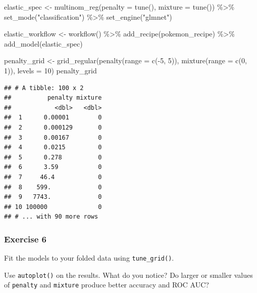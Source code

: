 \documentclass[
]{article}
\newenvironment{Shaded}{\begin{snugshade}}{\end{snugshade}}
\newcommand{\AttributeTok}[1]{\textcolor[rgb]{0.77,0.63,0.00}{#1}}
\newcommand{\DecValTok}[1]{\textcolor[rgb]{0.00,0.00,0.81}{#1}}
\newcommand{\FunctionTok}[1]{\textcolor[rgb]{0.00,0.00,0.00}{#1}}
\newcommand{\NormalTok}[1]{#1}
\newcommand{\OtherTok}[1]{\textcolor[rgb]{0.56,0.35,0.01}{#1}}
\newcommand{\SpecialCharTok}[1]{\textcolor[rgb]{0.00,0.00,0.00}{#1}}
\newcommand{\StringTok}[1]{\textcolor[rgb]{0.31,0.60,0.02}{#1}}
\begin{document}
\begin{Shaded}
\begin{Highlighting}[]
\NormalTok{elastic\_spec }\OtherTok{\textless{}{-}} 
  \FunctionTok{multinom\_reg}\NormalTok{(}\AttributeTok{penalty =} \FunctionTok{tune}\NormalTok{(), }\AttributeTok{mixture =} \FunctionTok{tune}\NormalTok{()) }\SpecialCharTok{\%\textgreater{}\%} 
  \FunctionTok{set\_mode}\NormalTok{(}\StringTok{"classification"}\NormalTok{) }\SpecialCharTok{\%\textgreater{}\%} 
  \FunctionTok{set\_engine}\NormalTok{(}\StringTok{"glmnet"}\NormalTok{)}

\NormalTok{elastic\_workflow }\OtherTok{\textless{}{-}} \FunctionTok{workflow}\NormalTok{() }\SpecialCharTok{\%\textgreater{}\%} 
  \FunctionTok{add\_recipe}\NormalTok{(pokemon\_recipe) }\SpecialCharTok{\%\textgreater{}\%} 
  \FunctionTok{add\_model}\NormalTok{(elastic\_spec)}

\NormalTok{penalty\_grid }\OtherTok{\textless{}{-}} \FunctionTok{grid\_regular}\NormalTok{(}\FunctionTok{penalty}\NormalTok{(}\AttributeTok{range =} \FunctionTok{c}\NormalTok{(}\SpecialCharTok{{-}}\DecValTok{5}\NormalTok{, }\DecValTok{5}\NormalTok{)), }
                             \FunctionTok{mixture}\NormalTok{(}\AttributeTok{range =} \FunctionTok{c}\NormalTok{(}\DecValTok{0}\NormalTok{, }\DecValTok{1}\NormalTok{)),}
                             \AttributeTok{levels =} \DecValTok{10}\NormalTok{)}
\NormalTok{penalty\_grid}
\end{Highlighting}
\end{Shaded}

\begin{verbatim}
## # A tibble: 100 x 2
##          penalty mixture
##            <dbl>   <dbl>
##  1      0.00001        0
##  2      0.000129       0
##  3      0.00167        0
##  4      0.0215         0
##  5      0.278          0
##  6      3.59           0
##  7     46.4            0
##  8    599.             0
##  9   7743.             0
## 10 100000              0
## # ... with 90 more rows
\end{verbatim}

\hypertarget{exercise-6}{%
\subsubsection{Exercise 6}\label{exercise-6}}

Fit the models to your folded data using \texttt{tune\_grid()}.

Use \texttt{autoplot()} on the results. What do you notice? Do larger or
smaller values of \texttt{penalty} and \texttt{mixture} produce better
accuracy and ROC AUC?
\end{document}
